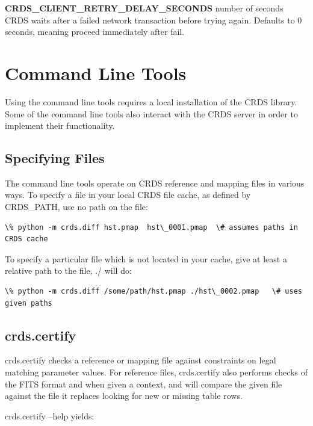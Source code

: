 \documentclass[letterpaper,10pt,english]{sphinxmanual}
\begin{document}
\textbf{CRDS\_CLIENT\_RETRY\_DELAY\_SECONDS} number of seconds CRDS waits after a failed
network transaction before trying again.  Defaults to 0 seconds,  meaning
proceed immediately after fail.


\chapter{Command Line Tools}
\label{command_line_tools:command-line-tools}\label{command_line_tools::doc}
Using the command line tools requires a local installation of the CRDS library.
Some of the command line tools also interact with the CRDS server in order to
implement their functionality.


\section{Specifying Files}
\label{command_line_tools:specifying-files}
The command line tools operate on CRDS reference and mapping files in various
ways.  To specify a file in your local CRDS file cache,  as defined by CRDS\_PATH,
use no path on the file:

\begin{Verbatim}[commandchars=\\\{\}]
\% python -m crds.diff hst.pmap  hst\_0001.pmap  \# assumes paths in CRDS cache
\end{Verbatim}

To specify a particular file which is not located in your cache,  give at least
a relative path to the file, ./ will do:

\begin{Verbatim}[commandchars=\\\{\}]
\% python -m crds.diff /some/path/hst.pmap ./hst\_0002.pmap   \# uses given paths
\end{Verbatim}


\section{crds.certify}
\label{command_line_tools:crds-certify}
crds.certify checks a reference or mapping file against constraints on legal
matching parameter values.   For reference files,  crds.certify also performs checks
of the FITS format and when given a context,  and will compare the given file against
the file it replaces looking for new or missing table rows.

crds.certify --help yields:
\end{document}
